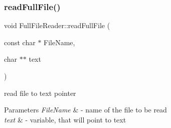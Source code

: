 \subsubsection{\texorpdfstring{read\+Full\+File()}{readFullFile()}}
{\footnotesize\ttfamily void Full\+File\+Reader\+::read\+Full\+File (\begin{DoxyParamCaption}\item[{const char $\ast$}]{File\+Name,  }\item[{char $\ast$$\ast$}]{text }\end{DoxyParamCaption})}

read file to text pointer 
\begin{DoxyParams}{Parameters}
{\em File\+Name} & -\/ name of the file to be read \\
\hline
{\em text} & -\/ variable, that will point to text \\
\hline
\end{DoxyParams}
